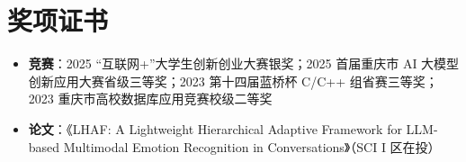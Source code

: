 \documentclass[10pt]{article}
\begin{document}


    \section[奖项证书]{\makebox[\iconwidth][c]{\color{primarycolor}{\faTrophy}}\quad 奖项证书}
    \begin{itemize}
        \item \textbf{竞赛}：2025 “互联网+”大学生创新创业大赛银奖；2025 首届重庆市 AI 大模型创新应用大赛省级三等奖；2023 第十四届蓝桥杯 C/C++ 组省赛三等奖；2023 重庆市高校数据库应用竞赛校级二等奖
        \item \textbf{论文}：《LHAF: A Lightweight Hierarchical Adaptive Framework for LLM-based Multimodal Emotion Recognition in Conversations》（SCI I 区在投）
    \end{itemize}
\end{document}
